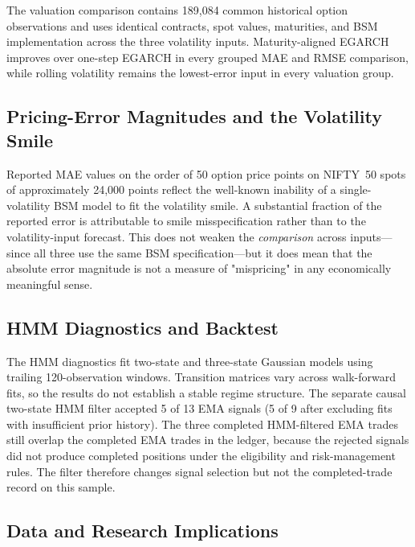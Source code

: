 \documentclass[journal]{IEEEtran}
\begin{document}
\fi
The valuation comparison contains 189{,}084 common historical option observations and uses identical contracts, spot values, maturities, and BSM implementation across the three volatility inputs. Maturity-aligned EGARCH improves over one-step EGARCH in every grouped MAE and RMSE comparison, while rolling volatility remains the lowest-error input in every valuation group. %

\subsection*{Pricing-Error Magnitudes and the Volatility Smile}

Reported MAE values on the order of 50 option price points on NIFTY~50 spots of approximately 24{,}000 points reflect the well-known inability of a single-volatility BSM model to fit the volatility smile. A substantial fraction of the reported error is attributable to smile misspecification rather than to the volatility-input forecast. This does not weaken the \emph{comparison} across inputs—since all three use the same BSM specification—but it does mean that the absolute error magnitude is not a measure of "mispricing" in any economically meaningful sense.

\subsection*{HMM Diagnostics and Backtest}

The HMM diagnostics fit two-state and three-state Gaussian models using trailing 120-observation windows. Transition matrices vary across walk-forward fits, so the results do not establish a stable regime structure. The separate causal two-state HMM filter accepted 5 of 13 EMA signals (5 of 9 after excluding fits with insufficient prior history). The three completed HMM-filtered EMA trades still overlap the completed EMA trades in the ledger, because the rejected signals did not produce completed positions under the eligibility and risk-management rules. The filter therefore changes signal selection but not the completed-trade record on this sample. %

\subsection*{Data and Research Implications}
\end{document}
